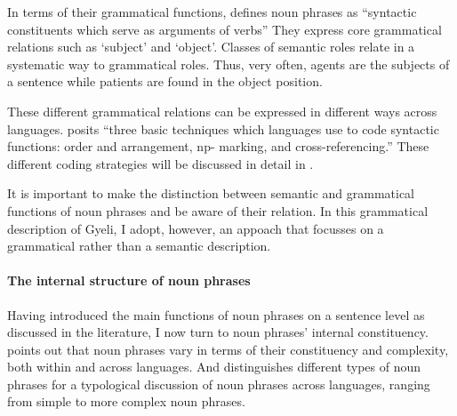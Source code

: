 In terms of their grammatical functions, \citet[151]{dryer2007} defines noun phrases as ``syntactic constituents which serve as arguments of verbs'' They express core grammatical relations such as `subject' and `object'. Classes of semantic roles relate in a systematic way to grammatical roles. Thus, very often, agents are the subjects of a sentence while patients are found in the object position.

These different grammatical relations can be expressed in different ways across languages. \citet[141]{andrews2007} posits ``three basic techniques which languages use to code syntactic functions: order and arrangement, np- marking, and cross-referencing.'' These different coding strategies will be discussed in detail in .

It is important to make the distinction between semantic and grammatical functions of noun phrases and be aware of their relation. In this grammatical description of Gyeli, I adopt, however, an appoach that focusses on a grammatical rather than a semantic description.

\paragraph{The internal structure of noun phrases} Having introduced the main functions of noun phrases on a sentence level as discussed in the literature, I now turn to noun phrases' internal constituency. \citet[23]{rijkhoff2002} points out that noun phrases vary in terms of their constituency and complexity, both within and across languages.  And \citet[151]{dryer2007} distinguishes different  types of noun phrases for a typological discussion of noun phrases across languages, ranging from simple to more complex noun phrases. %


